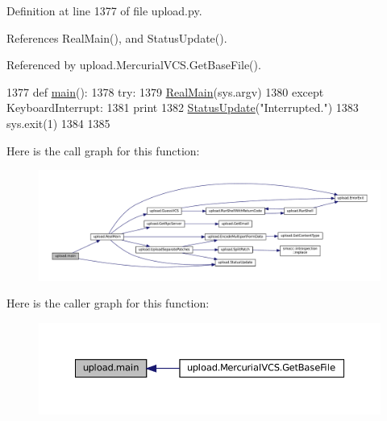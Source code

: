 Definition at line 1377 of file upload.\+py.



References Real\+Main(), and Status\+Update().



Referenced by upload.\+Mercurial\+V\+C\+S.\+Get\+Base\+File().


\begin{DoxyCode}
1377 \textcolor{keyword}{def }\hyperlink{namespaceupload_aef3fcf7a8d77d13ba75adbf58b6c43ee}{main}():
1378   \textcolor{keywordflow}{try}:
1379     \hyperlink{namespaceupload_ad6226af96c9f1905602b8002bd5de952}{RealMain}(sys.argv)
1380   \textcolor{keywordflow}{except} KeyboardInterrupt:
1381     \textcolor{keywordflow}{print}
1382     \hyperlink{namespaceupload_a79ce84c196c018f3b0c7ff7a9b626b58}{StatusUpdate}(\textcolor{stringliteral}{"Interrupted."})
1383     sys.exit(1)
1384 
1385 
\end{DoxyCode}
Here is the call graph for this function\+:
\nopagebreak
\begin{figure}[H]
\begin{center}
\leavevmode
\includegraphics[width=350pt]{namespaceupload_aef3fcf7a8d77d13ba75adbf58b6c43ee_cgraph}
\end{center}
\end{figure}
Here is the caller graph for this function\+:
\nopagebreak
\begin{figure}[H]
\begin{center}
\leavevmode
\includegraphics[width=350pt]{namespaceupload_aef3fcf7a8d77d13ba75adbf58b6c43ee_icgraph}
\end{center}
\end{figure}
\mbox{\label{namespaceupload_ad6226af96c9f1905602b8002bd5de952}} 
